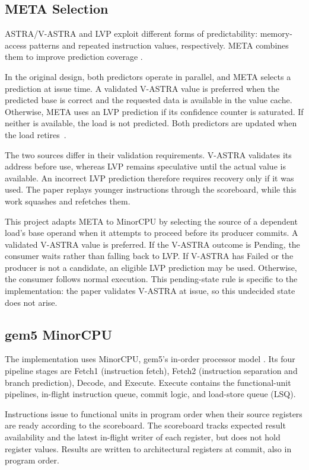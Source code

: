 \subsection{META Selection}

ASTRA/V-ASTRA and LVP exploit different forms of predictability:
memory-access patterns and repeated instruction values, respectively.
META combines them to improve prediction coverage
\cite{ravenel2025architecting}.

In the original design, both predictors operate in parallel, and
META selects a prediction at issue time. A validated V-ASTRA value
is preferred when the predicted base is correct and the requested
data is available in the value cache. Otherwise, META uses an
LVP prediction if its confidence counter is saturated. If neither
is available, the load is not predicted. Both predictors are updated
when the load retires~\cite{ravenel2025architecting}.

The two sources differ in their validation requirements. V-ASTRA
validates its address before use, whereas LVP remains speculative
until the actual value is available. An incorrect LVP prediction
therefore requires recovery only if it was used. The paper replays
younger instructions through the scoreboard, while this work
squashes and refetches them.

This project adapts META to MinorCPU by selecting the source of
a dependent load's base operand when it attempts to proceed before
its producer commits. A validated V-ASTRA value is preferred.
If the V-ASTRA outcome is Pending, the consumer waits rather than
falling back to LVP. If V-ASTRA has Failed or the producer is not
a candidate, an eligible LVP prediction may be used. Otherwise,
the consumer follows normal execution. This pending-state rule is
specific to the implementation: the paper validates V-ASTRA at
issue, so this undecided state does not arise.

\subsection{gem5 MinorCPU}
\label{sec:bg-minor}

The implementation uses MinorCPU, gem5's in-order processor model
\cite{gem5}. Its four pipeline stages are Fetch1 (instruction fetch),
Fetch2 (instruction separation and branch prediction), Decode, and
Execute. Execute contains the functional-unit pipelines, in-flight
instruction queue, commit logic, and load-store queue (LSQ).

Instructions issue to functional units in program order when their
source registers are ready according to the scoreboard. The
scoreboard tracks expected result availability and the latest
in-flight writer of each register, but does not hold register values.
Results are written to architectural registers at commit, also in
program order.


